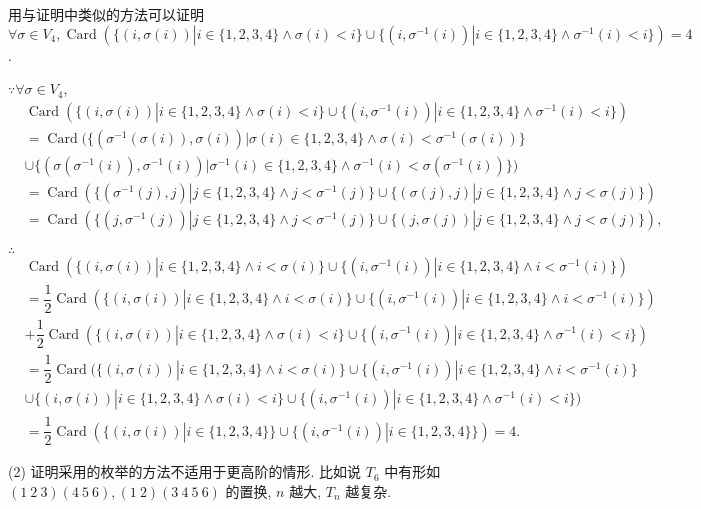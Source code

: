 \documentclass{ctexart}
\begin{document}
\begin{note}
    用与证明中类似的方法可以证明 $\forall\sigma\in V_4,\operatorname{Card}(\{(i,\sigma(i))|i\in\{1,2,3,4\}\land\sigma(i)<i\}\cup\{(i,\sigma^{-1}(i))|i\in\{1,2,3,4\}\land\sigma^{-1}(i)<i\})=4$.

    $\because\forall\sigma\in V_4$,
    \begin{align*}
        & \operatorname{Card}(\{(i,\sigma(i))|i\in\{1,2,3,4\}\land\sigma(i)<i\}\cup\{(i,\sigma^{-1}(i))|i\in\{1,2,3,4\}\land\sigma^{-1}(i)<i\}) \\
        & =\operatorname{Card}(\{(\sigma^{-1}(\sigma(i)),\sigma(i))|\sigma(i)\in\{1,2,3,4\}\land\sigma(i)<\sigma^{-1}(\sigma(i))\} \\
        & \cup\{(\sigma(\sigma^{-1}(i)),\sigma^{-1}(i))|\sigma^{-1}(i)\in\{1,2,3,4\}\land\sigma^{-1}(i)<\sigma(\sigma^{-1}(i))\}) \\
        & =\operatorname{Card}(\{(\sigma^{-1}(j),j)|j\in\{1,2,3,4\}\land j<\sigma^{-1}(j)\}\cup\{(\sigma(j),j)|j\in\{1,2,3,4\}\land j<\sigma(j)\}) \\
        & =\operatorname{Card}(\{(j,\sigma^{-1}(j))|j\in\{1,2,3,4\}\land j<\sigma^{-1}(j)\}\cup\{(j,\sigma(j))|j\in\{1,2,3,4\}\land j<\sigma(j)\}),
    \end{align*}

    $\therefore$
    \begin{align*}
        & \operatorname{Card}(\{(i,\sigma(i))|i\in\{1,2,3,4\}\land i<\sigma(i)\}\cup\{(i,\sigma^{-1}(i))|i\in\{1,2,3,4\}\land i<\sigma^{-1}(i)\}) \\
        & =\dfrac{1}{2}\operatorname{Card}(\{(i,\sigma(i))|i\in\{1,2,3,4\}\land i<\sigma(i)\}\cup\{(i,\sigma^{-1}(i))|i\in\{1,2,3,4\}\land i<\sigma^{-1}(i)\}) \\
        & +\dfrac{1}{2}\operatorname{Card}(\{(i,\sigma(i))|i\in\{1,2,3,4\}\land\sigma(i)<i\}\cup\{(i,\sigma^{-1}(i))|i\in\{1,2,3,4\}\land\sigma^{-1}(i)<i\}) \\
        & =\dfrac{1}{2}\operatorname{Card}(\{(i,\sigma(i))|i\in\{1,2,3,4\}\land i<\sigma(i)\}\cup\{(i,\sigma^{-1}(i))|i\in\{1,2,3,4\}\land i<\sigma^{-1}(i)\} \\
        & \cup\{(i,\sigma(i))|i\in\{1,2,3,4\}\land\sigma(i)<i\}\cup\{(i,\sigma^{-1}(i))|i\in\{1,2,3,4\}\land\sigma^{-1}(i)<i\}) \\
        & =\dfrac{1}{2}\operatorname{Card}(\{(i,\sigma(i))|i\in\{1,2,3,4\}\}\cup\{(i,\sigma^{-1}(i))|i\in\{1,2,3,4\}\})=4.
    \end{align*}

    (2) 证明采用的枚举的方法不适用于更高阶的情形. 比如说 $T_6$ 中有形如 $(1\ 2\ 3)(4\ 5\ 6),(1\ 2)(3\ 4\ 5\ 6)$ 的置换, $n$ 越大, $T_n$ 越复杂.
\end{note}
\end{document}
